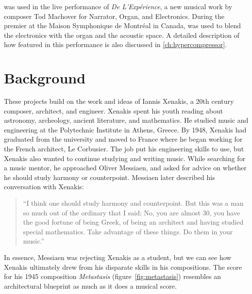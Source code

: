 \thesis was used in the live performance of \textit{De
  L'Exp\'{e}rience}, a new musical work by composer Tod Machover for
Narrator, Organ, and Electronics. During the premier at the Maison
Symphonique de Montr\'{e}al in Canada, \thesis was used to blend the
electronics with the organ and the acoustic space. 
A detailed description of how \thesis featured in this performance is
also discussed in \autoref{ch:hypercompressor}.

\section{Background}
\label{sec:background}
These projects build on the work and ideas of Iannis Xenakis, a 20th
century composer, architect, and engineer. Xenakis spent his youth
reading about astronomy, archeology, ancient literature, and
mathematics.\cite[]{Hoffmann2015} He studied music and engineering at
the Polytechnic Institute in Athens, Greece. By 1948, Xenakis had
graduated from the university and moved to France where he began
working for the French architect, Le Corbusier. The job put his
engineering skills to use, but Xenakis also wanted to continue
studying and writing music. While searching for a music mentor, he
approached Oliver Messiaen, and asked for advice
on whether he should study harmony or counterpoint. Messiaen later
described his conversation with Xenakis:
\begin{quotation}``I think one should study harmony and
  counterpoint. But this was a man so much out of the ordinary that I
  said: No, you are almost 30, you have the good fortune of being
  Greek, of being an architect and having studied special
  mathematics. Take advantage of these things. Do them in your
  music.''\cite{Service2013}
\end{quotation}
In essence, Messiaen was rejecting Xenakis as a student, but we can
see how Xenakis ultimately drew from his disparate skills in his
compositions. The score for his 1945 composition \textit{Metastasis}
(figure~\ref{fig:metastasis}) resembles an architectural blueprint as
much as it does a musical score.

